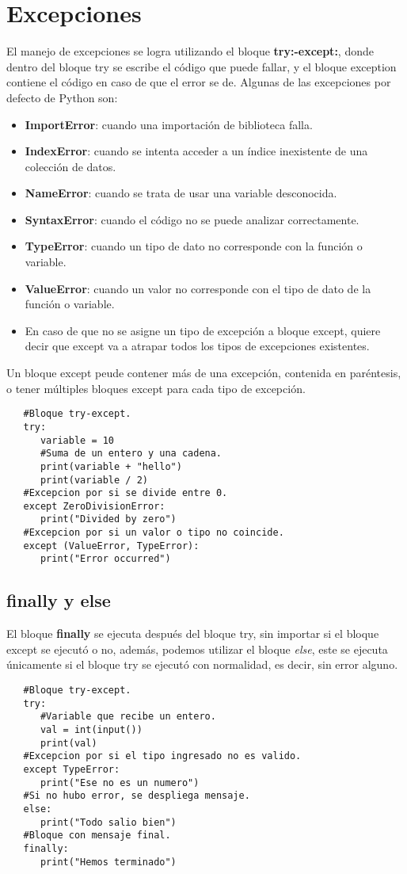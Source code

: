 \section{Excepciones}
\hspace{0.55cm}El manejo de excepciones se logra utilizando el bloque \textbf{try:-except:}, donde dentro del bloque try se escribe el código que puede fallar, y el bloque exception contiene el código en caso de que el error se de. Algunas de las excepciones por defecto de Python son:
\begin{itemize}
	\item \textbf{ImportError}: cuando una importación de biblioteca falla.
	\item \textbf{IndexError}: cuando se intenta acceder a un índice inexistente de una colección de datos.
	\item \textbf{NameError}: cuando se trata de usar una variable desconocida.
	\item \textbf{SyntaxError}: cuando el código no se puede analizar correctamente.
	\item \textbf{TypeError}: cuando un tipo de dato no corresponde con la función o variable.
	\item \textbf{ValueError}: cuando un valor no corresponde con el tipo de dato de la función o variable.
	\item En caso de que no se asigne un tipo de excepción a bloque except, quiere decir que except va a atrapar todos los tipos de excepciones existentes.
\end{itemize}

Un bloque except peude contener más de una excepción, contenida en paréntesis, o tener múltiples bloques except para cada tipo de excepción.
\begin{lstlisting}
   #Bloque try-except.   
   try:
      variable = 10
      #Suma de un entero y una cadena.
      print(variable + "hello")
      print(variable / 2)
   #Excepcion por si se divide entre 0.
   except ZeroDivisionError:
      print("Divided by zero")
   #Excepcion por si un valor o tipo no coincide.
   except (ValueError, TypeError):
      print("Error occurred")
\end{lstlisting}


\subsection{finally y else}
\hspace{0.55cm}El bloque \textbf{finally} se ejecuta después del bloque try, sin importar si el bloque except se ejecutó o no, además, podemos utilizar el bloque \textit{else}, este se ejecuta únicamente si el bloque try se ejecutó con normalidad, es decir, sin error alguno.
\begin{lstlisting}
   #Bloque try-except.   
   try:
      #Variable que recibe un entero.
      val = int(input())
      print(val)
   #Excepcion por si el tipo ingresado no es valido.
   except TypeError:
      print("Ese no es un numero")
   #Si no hubo error, se despliega mensaje.
   else:
      print("Todo salio bien")
   #Bloque con mensaje final.
   finally:
      print("Hemos terminado")
\end{lstlisting}


